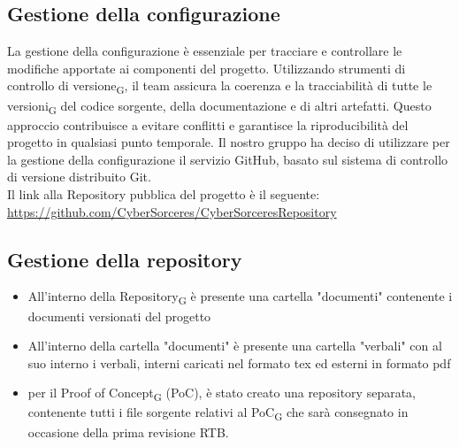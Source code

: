 \documentclass{article}
\begin{document}
\subsection{Gestione della configurazione}
La gestione della configurazione è essenziale per tracciare e controllare le modifiche apportate ai componenti del progetto. Utilizzando strumenti di controllo di versione\textsubscript{G}, il team assicura la coerenza e la tracciabilità di tutte le versioni\textsubscript{G} del codice sorgente, della documentazione e di altri artefatti. Questo approccio contribuisce a evitare conflitti e garantisce la riproducibilità del progetto in qualsiasi punto temporale. Il nostro gruppo ha deciso di utilizzare per la gestione della configurazione il servizio GitHub, basato sul sistema di controllo di versione distribuito Git. \\ Il link alla Repository pubblica del progetto è il seguente: \\ \href{https://github.com/CyberSorceres/CyberSorceresRepository}{https://github.com/CyberSorceres/CyberSorceresRepository}
\subsection*{Gestione della repository}
\begin{itemize}
    \item All'interno della Repository\textsubscript{G} è presente una cartella "documenti" contenente i documenti versionati del progetto
    \item All'interno della cartella "documenti" è presente una cartella "verbali" con al suo interno i verbali, interni caricati nel formato tex ed esterni in formato pdf
    \item per il Proof of Concept\textsubscript{G} (PoC), è stato creato una repository separata, contenente tutti i file sorgente relativi al PoC\textsubscript{G} che sarà consegnato in occasione della prima revisione RTB.
\end{itemize}
\end{document}
